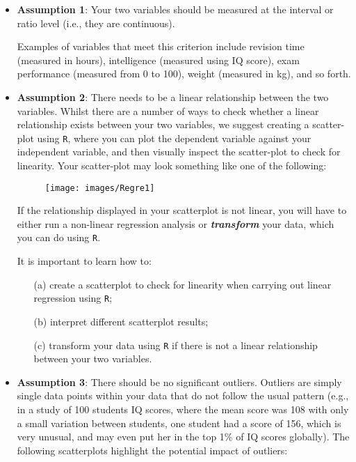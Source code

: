 \documentclass[]{report}
\begin{document}
\begin{itemize}
	\item \textbf{Assumption 1}: Your two variables should be measured at the interval or ratio level (i.e., they are continuous). 
	
	Examples of variables that meet this criterion include revision time (measured in hours), intelligence (measured using IQ score), exam performance (measured from 0 to 100), weight (measured in kg), and so forth. 
	
	
	\item \textbf{Assumption 2}: There needs to be a linear relationship between the two variables. Whilst there are a number of ways to check whether a linear relationship exists between your two variables, we suggest creating a scatter-plot using \texttt{R}, where you can plot the dependent variable against your independent variable, and then visually inspect the scatter-plot to check for linearity. Your scatter-plot may look something like one of the following:
	
	
	
	\begin{figure}
		\centering
		\texttt{[image: images/Regre1]}
		\caption{}
		\label{fig:regre1}
	\end{figure}
	If the relationship displayed in your scatterplot is not linear, you will have to either run a non-linear regression analysis or \textbf{\textit{transform}} your data, which you can do using \texttt{R}. 
	
	It is important to learn how to: \begin{itemize}
		\item[(a)] create a scatterplot to check for linearity when carrying out linear regression using \texttt{R}; \item[(b)] interpret different scatterplot results; 
		\item[(c)] transform your data using \texttt{R} if there is not a linear relationship between your two variables.
	\end{itemize} 
	
	\item \textbf{Assumption 3}: There should be no significant outliers. Outliers are simply single data points within your data that do not follow the usual pattern (e.g., in a study of 100 students IQ scores, where the mean score was 108 with only a small variation between students, one student had a score of 156, which is very unusual, and may even put her in the top 1\% of IQ scores globally). The following scatterplots highlight the potential impact of outliers:
	

\end{itemize}
\end{document}
